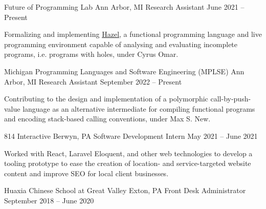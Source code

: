 \documentclass[letterpaper,11pt]{article}
\begin{document}
  \begin{rsectionlist}
    \rsectionitem
      {Future of Programming Lab}
      {Ann Arbor, MI}
      {Research Assistant}
      {June 2021 -- Present}
      
      Formalizing and implementing \href{https://hazel.org}{Hazel}, a functional programming
      language and live programming environment capable of analysing and evaluating incomplete
      programs, i.e. programs with holes, under Cyrus Omar.

      \begin{rpointlist}
      \end{rpointlist}

    \rsectionitem
      {Michigan Programming Languages and Software Engineering (MPLSE)}
      {Ann Arbor, MI}
      {Research Assistant}
      {September 2022 -- Present}

      Contributing to the design and implementation of a polymorphic call-by-push-value language as
      an alternative intermediate for compiling functional programs and encoding stack-based calling
      conventions, under Max S. New.

    \rsectionitem
      {814 Interactive}
      {Berwyn, PA}
      {Software Development Intern}
      {May 2021 -- June 2021}

      Worked with React, Laravel Eloquent, and other web technologies to develop a tooling prototype
      to ease the creation of location- and service-targeted website content and improve SEO for
      local client businesses.

    \rsectionitem
      {Huaxia Chinese School at Great Valley}
      {Exton, PA}
      {Front Desk Administrator}
      {September 2018 -- June 2020}


\end{rsectionlist}
\end{document}

